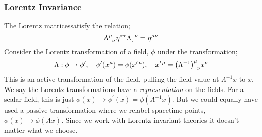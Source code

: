\subsubsection{Lorentz Invariance}
The Lorentz matrices\footnotemark satisfy the relation; 
\begin{equation}
\label{eq:LT}
\Lambda\indices{^\mu_\sigma}\eta\indices{^{\sigma \tau}}\Lambda\indices{_\tau ^\nu} = \etamn{^}
\end{equation}
Consider the Lorentz transformation of a field, $\phi$ under the transformation;\footnotemark
{}
\begin{equation*}
\Lambda : \phi \rightarrow \phi^{\prime}, \quad \phi^{\prime}(x^\mu) = \phi(x^{\prime \, \mu}), \quad x^{\prime \, \mu} = \left(\Lambda^{-1}\right)\indices{^\mu_\nu} x^\nu
\end{equation*}
This is an active transformation of the field, pulling the field value at $\Lambda^{-1} x$ to $x$. We say the Lorentz transformations have a \emph{representation} on the fields. For a scalar field, this is just $\phi(x) \rightarrow \phi^{\prime}(x) = \phi(\Lambda^{-1} x)$. But we could equally have used a passive transformation where we relabel spacetime points, $\phi(x) \rightarrow \phi(\Lambda x)$. Since we work with Lorentz invariant theories it doesn't matter what we choose.

